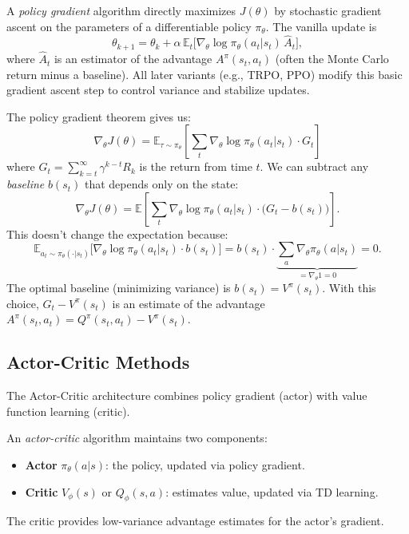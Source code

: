 \begin{definition}
    A \emph{policy gradient} algorithm directly maximizes $J(\theta)$ by stochastic gradient ascent on the parameters of a differentiable policy $\pi_\theta$.
    The vanilla update is
    \[
        \theta_{k+1} = \theta_k + \alpha \, \mathbb{E}_t \bigl[ \nabla_\theta \log \pi_\theta(a_t|s_t) \, \widehat{A}_t \bigr],
    \]
    where $\widehat{A}_t$ is an estimator of the advantage $A^\pi(s_t, a_t)$ (often the Monte Carlo return minus a baseline).
    All later variants (e.g., TRPO, PPO) modify this basic gradient ascent step to control variance and stabilize updates.
\end{definition}

\begin{remark}
    The policy gradient theorem gives us:
    \[
        \nabla_\theta J(\theta) = \mathbb{E}_{\tau \sim \pi_\theta} \left[ \sum_{t} \nabla_\theta \log \pi_\theta(a_t | s_t) \cdot G_t \right]
    \]
    where $G_t = \sum_{k=t}^{\infty} \gamma^{k-t} R_k$ is the return from time $t$. We can subtract any \emph{baseline} $b(s_t)$ that depends only on the state:
    \[
        \nabla_\theta J(\theta) = \mathbb{E} \left[ \sum_{t} \nabla_\theta \log \pi_\theta(a_t | s_t) \cdot \bigl(G_t - b(s_t)\bigr) \right].
    \]
    This doesn't change the expectation because:
    \[
        \mathbb{E}_{a_t \sim \pi_\theta(\cdot|s_t)}\bigl[\nabla_\theta \log \pi_\theta(a_t|s_t) \cdot b(s_t)\bigr] = b(s_t) \cdot \underbrace{\sum_{a} \nabla_\theta \pi_\theta(a|s_t)}_{= \nabla_\theta 1 = 0} = 0.
    \]
    The optimal baseline (minimizing variance) is $b(s_t) = V^\pi(s_t)$. With this choice, $G_t - V^\pi(s_t)$ is an estimate of the advantage $A^\pi(s_t, a_t) = Q^\pi(s_t, a_t) - V^\pi(s_t)$.
\end{remark}

\subsection{Actor-Critic Methods}

The Actor-Critic architecture combines policy gradient (actor) with value function learning (critic).

\begin{definition}
    An \emph{actor-critic} algorithm maintains two components:
    \begin{itemize}
        \item \textbf{Actor} $\pi_\theta(a|s)$: the policy, updated via policy gradient.
        \item \textbf{Critic} $V_\phi(s)$ or $Q_\phi(s,a)$: estimates value, updated via TD learning.
    \end{itemize}
    The critic provides low-variance advantage estimates for the actor's gradient.
\end{definition}

